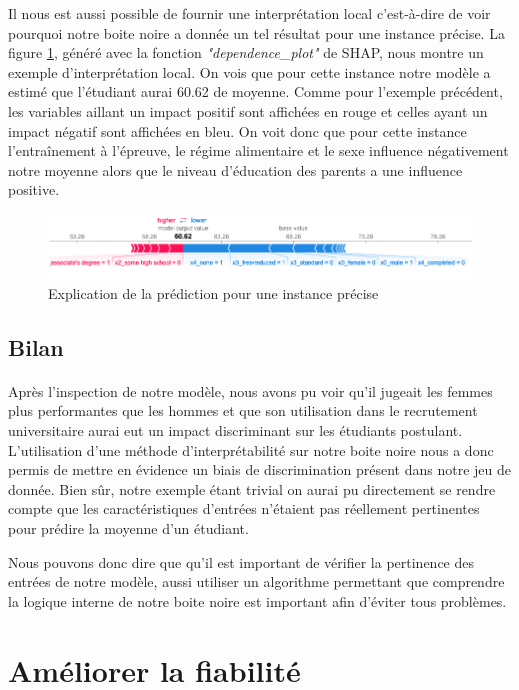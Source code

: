 Il nous est aussi possible de fournir une interprétation local c'est-à-dire de voir pourquoi notre boite noire a donnée un tel résultat pour une instance précise. La figure \ref{shapPlotLocal}, généré avec la fonction \textit{"dependence\_plot"} de SHAP, nous montre un exemple d'interprétation local. On vois que pour cette instance notre modèle a estimé que l'étudiant aurai 60.62 de moyenne. Comme pour l'exemple précédent, les variables aillant un impact positif sont affichées en rouge et celles ayant un impact négatif sont affichées en bleu. On voit donc que pour cette instance l'entraînement à l'épreuve, le régime alimentaire et le sexe influence négativement notre moyenne alors que le niveau d’éducation des parents a une influence positive.
\begin{figure}[h]
    \includegraphics[scale=0.5]{src_img/shapPlotLocal.png}
    \caption{Explication de la prédiction pour une instance précise}
    \label{shapPlotLocal}
\end{figure}

\subsection{Bilan}
 \paragraph{}Après l'inspection de notre modèle, nous avons pu voir qu'il jugeait les femmes plus performantes que les hommes et que son utilisation dans le recrutement universitaire aurai eut un impact discriminant sur les étudiants postulant. L'utilisation d'une méthode d'interprétabilité sur notre boite noire nous a donc permis de mettre en évidence un biais de discrimination présent dans notre jeu de donnée. Bien sûr, notre exemple étant trivial on aurai pu directement se rendre compte que les caractéristiques d'entrées n'étaient pas réellement pertinentes pour prédire la moyenne d'un étudiant.\par
 Nous pouvons donc dire que qu'il est important de vérifier la pertinence des entrées de notre modèle, aussi utiliser un algorithme permettant que comprendre la logique interne de notre boite noire est important afin d'éviter tous problèmes.

\section{Améliorer la fiabilité}
